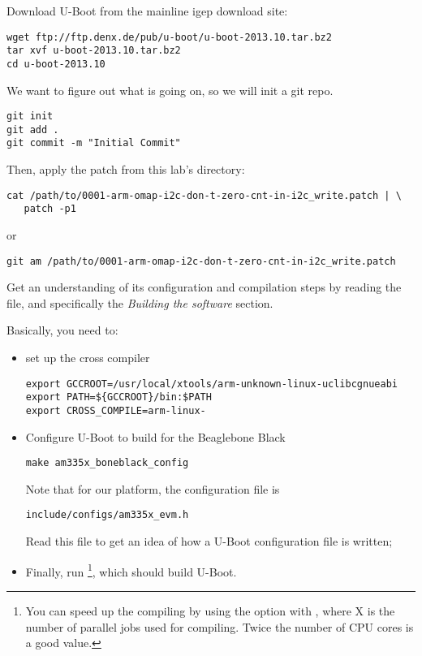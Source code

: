 Download U-Boot from the mainline igep download site:

\begin{verbatim}
wget ftp://ftp.denx.de/pub/u-boot/u-boot-2013.10.tar.bz2
tar xvf u-boot-2013.10.tar.bz2
cd u-boot-2013.10
\end{verbatim}

We want to figure out what is going on, so we will init a git repo.

\begin{verbatim}
git init
git add .
git commit -m "Initial Commit"
\end{verbatim}

Then, apply the
 patch from
this lab's  directory:

{\small
\begin{verbatim}
cat /path/to/0001-arm-omap-i2c-don-t-zero-cnt-in-i2c_write.patch | \
   patch -p1
\end{verbatim}
}

or

{\small
\begin{verbatim}
git am /path/to/0001-arm-omap-i2c-don-t-zero-cnt-in-i2c_write.patch
\end{verbatim}
}


Get an understanding of its configuration and compilation steps by
reading the \code{README} file, and specifically the {\em Building the
  software} section.

Basically, you need to:

\begin{itemize}
\item set up the cross compiler 
\begin{verbatim}
export GCCROOT=/usr/local/xtools/arm-unknown-linux-uclibcgnueabi
export PATH=${GCCROOT}/bin:$PATH
export CROSS_COMPILE=arm-linux-
\end{verbatim}

\item Configure U-Boot to build for the Beaglebone Black
\begin{verbatim}
make am335x_boneblack_config
\end{verbatim}

  Note that for our platform, the configuration file is
\begin{verbatim}
include/configs/am335x_evm.h
\end{verbatim}
Read this file to get an
  idea of how a U-Boot configuration file is written;

\item Finally, run \footnote{You can speed up the compiling
  by using the \code{-jX} option with \code{make}, where X is the number of parallel
  jobs used for compiling. Twice the number of CPU cores is a good
  value.}, which should build U-Boot.

\end{itemize}

